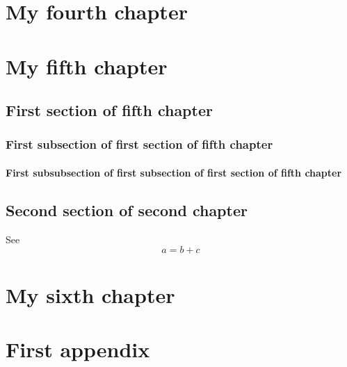 \documentclass[language=english,debug=true,a4paper,twoside,12pt]{lmc}
\begin{document}
\tableofcontents
\listoffigures
\listoftables





\chapter{My fourth chapter}
\lipsum[9-9]
\chapter{My fifth chapter}
\lipsum[9]
\section{First section of fifth chapter}
\subsection{First subsection of first section of fifth chapter}
\subsubsection{First subsubsection of first subsection of first section of fifth chapter}
\lipsum[15]
\section{Second section of second chapter}
\lipsum[15]
See \cite{timoshenko_theory_1985}
\begin{equation}
    a = b + c
    \label{eq:sum}
\end{equation}
\lipsum[3-20]
\chapter{My sixth chapter}
\lipsum[9]



\cleardoublepage %
\printbibliography

\appendix
\chapter{First appendix}
\end{document}
